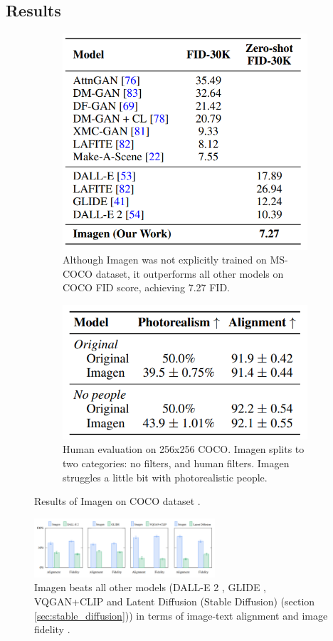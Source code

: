 \subsection{Results}

\begin{figure}[t!]
    \centering
    \begin{subfigure}{0.4\textwidth}
        \centering
        \includegraphics[width=0.6\linewidth]{images/imagen/imagen_coco_zeroshot.png}
        \caption{Although Imagen was not explicitly trained on MS-COCO dataset, it outperforms all other models on COCO FID score, achieving 7.27 FID.}
        \label{fig:imagen_coco_zeroshot}
    \end{subfigure}
    \begin{subfigure}{0.4\textwidth}
        \centering
        \includegraphics[width=0.6\linewidth]{images/imagen/imagen_coco_human_eval.png}
        \caption{Human evaluation on 256x256 COCO. Imagen splits to two categories: no filters, and human filters. Imagen struggles a little bit with photorealistic people.}
        \label{fig:imagen_coco_human_eval}
    \end{subfigure}
    \caption{Results of Imagen on COCO dataset \cite{imagen}.}
\end{figure}

\begin{figure}
    \centering
    \includegraphics[width=0.6\textwidth]{images/imagen/alignment_fidelity_imagen_vs_models.png}
    \caption{Imagen beats all other models (DALL-E 2 \cite{dalle_2}, GLIDE \cite{glide}, VQGAN+CLIP \cite{vqgan_clip} and Latent Diffusion (Stable Diffusion) \cite{stable_diffusion} (section \ref{sec:stable_diffusion})) in terms of image-text alignment and image fidelity \cite{imagen}.}
    \label{fig:imagen_alignment_fidelity_vs_other_models}
\end{figure}

